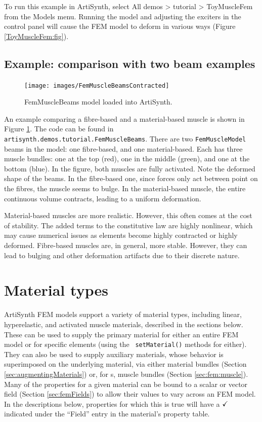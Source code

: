 To run this example in ArtiSynth, select {\sf All demos > tutorial >
ToyMuscleFem} from the {\sf Models} menu. Running the model and adjusting the
exciters in the control panel will cause the FEM model to deform in various
ways (Figure \ref{ToyMuscleFem:fig}).

\subsection{Example: comparison with two beam examples}
\label{FemMuscleBeams:sec}

\begin{figure}[ht]
	\centering
	\texttt{[image: images/FemMuscleBeamsContracted]}
	\caption{FemMuscleBeams model loaded into ArtiSynth.}
	\label{fig:fem:musclebeams}
\end{figure}

An example comparing a fibre-based and a material-based muscle is shown 
in Figure \ref{fig:fem:musclebeams}.  The code can be found in 
{\tt artisynth.demos.tutorial.FemMuscleBeams}.  There are two 
{\tt FemMuscleModel} beams in the model: one fibre-based, and one 
material-based.  Each has three muscle bundles: one at the top (red),
one in the middle (green), and one at the bottom (blue).  In the figure,
both muscles are fully activated.  Note the deformed shape of the beams.
In the fibre-based one, since forces only act between point on the fibres,
the muscle seems to bulge.  In the material-based muscle, the entire
continuous volume contracts, leading to a uniform deformation.  

Material-based muscles are more realistic.  However, this often comes at the cost
of stability.  The added terms to the constitutive law are highly nonlinear,
which may cause numerical issues as elements become highly contracted or
highly deformed.  Fibre-based muscles are, in general, more stable.  However,
they can lead to bulging and other deformation artifacts due to their discrete
nature.

\section{Material types}
\label{MaterialTypes:sec}

ArtiSynth FEM models support a variety of material types, including
linear, hyperelastic, and activated muscle materials, described in the
sections below. These can be used to supply the primary material for
either an entire FEM model or for specific elements (using the {\tt
setMaterial()} methods for either). They can also be used to supply
auxiliary materials, whose behavior is superimposed on the underlying
material, via either material bundles
(Section \ref{sec:augmentingMaterials}) or,
for s, muscle bundles
(Section \ref{sec:fem:muscle}). Many of the properties for a given
material can be bound to a scalar or vector field
(Section \ref{sec:femFields}) to allow their values to vary across an
FEM model. In the descriptions below, properties for which this is
true will have a $\check$ indicated under the ``Field'' entry in the
material's property table.

